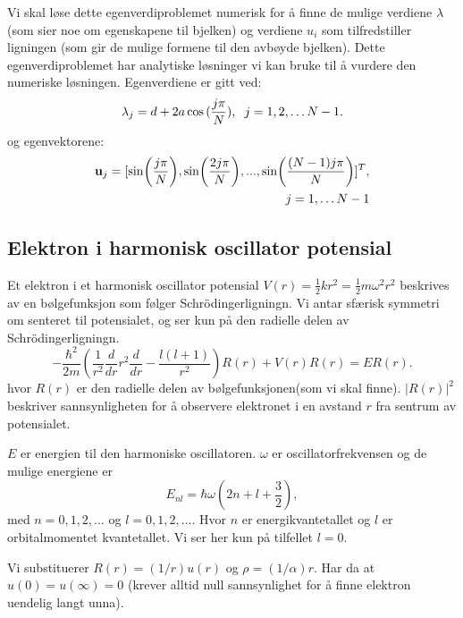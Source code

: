 \documentclass[reprint,english,notitlepage]{revtex4-1}
\begin{document}
	Vi skal løse dette egenverdiproblemet numerisk for å finne de mulige verdiene $\lambda$ (som sier noe om egenskapene til bjelken) og verdiene $u_i$ som tilfredstiller ligningen (som gir de mulige formene til den avbøyde bjelken).
	Dette egenverdiproblemet har analytiske løsninger vi kan bruke til å vurdere den numeriske løsningen. Egenverdiene er gitt ved:
	\begin{equation*}
	\lambda_j = d+2a\cos{(\frac{j\pi}{N})}, \hspace{0.2cm} j=1,2,\dots N-1.
	\end{equation*}
	og egenvektorene:
	\begin{equation*}
	\begin{aligned}
	\mathbf{u}_j = [ \sin(\frac{j\pi}{N}), \sin(\frac{2j\pi}{N}), ..., \sin(\frac{(N-1)j\pi}{N}) ]^T,\\ \hspace{0.2cm} j=1,\dots N-1
	\end{aligned}
	\end{equation*}
	
\subsection{Elektron i harmonisk oscillator potensial}
	
	Et elektron i et harmonisk oscillator potensial $V(r) = \frac{1}{2}kr^2 = \frac{1}{2}m\omega^2r^2$ beskrives av en bølgefunksjon som følger Schrödingerligningn. Vi antar sfærisk symmetri om senteret til potensialet, og ser kun på den radielle delen av Schrödingerligningn. 
	\begin{equation*}
	-\frac{\hbar^2}{2 m} \left ( \frac{1}{r^2} \frac{d}{dr} r^2
	\frac{d}{dr} - \frac{l (l + 1)}{r^2} \right )R(r) 
	+ V(r) R(r) = E R(r).
	\end{equation*}
	hvor $R(r)$ er den radielle delen av bølgefunksjonen(som vi skal finne). $|R(r)|^2$ beskriver sannsynligheten for å observere elektronet i en avstand $r$ fra sentrum av potensialet.
	
	$E$ er energien til den harmoniske oscillatoren. $\omega$ er oscillatorfrekvensen og de mulige energiene er
	\begin{equation*}
	E_{nl}=  \hbar \omega \left(2n+l+\frac{3}{2}\right),
	\end{equation*}
	med $n=0,1,2,\dots$ og $l=0,1,2,\dots$. Hvor $n$ er energikvantetallet og $l$ er orbitalmomentet kvantetallet. Vi ser her kun på tilfellet $l = 0$.
	
	Vi substituerer $R(r) = (1/r) u(r)$ og $\rho = (1/\alpha) r$. Har da at $u(0) = u(\infty) = 0$ (krever alltid null sannsynlighet for å finne elektron uendelig langt unna).
	
\end{document}
